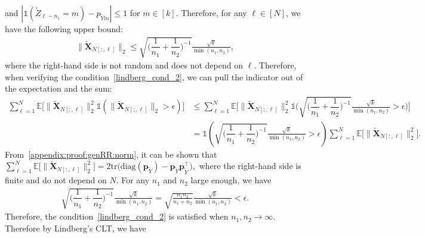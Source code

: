 \documentclass[twoside,11pt]{article}
\newcommand{\indicator}[1]{\mathds{1}\left( #1 \right) }%
\newcommand{\rvTwo}{Y}
\newcommand{\rvThree}{Z}
\newcommand{\vectorize}[1]{\mathbf{#1}}
\newcommand{\rvX}{X} %
\newcommand{\rVecX}{\vectorize{\rvX}}
\newcommand{\rvY}{Y}
\newcommand{\mE}{\mathbb{E}} %
\newcommand{\alphabetSize}{k} %
\newcommand{\vectorIndex}{m}
\newcommand{\sampleSize}{n}
\newcommand{\probVecElement}[2]{p_{{#1}{#2}}}
\newcommand{\probVec}{\mathbf{p}} %
\begin{document}
\begin{appendix}
	and
	$| \mathds{1}(\tilde{\rvThree}_{\ell-\sampleSize_1} = \vectorIndex)   - \probVecElement{ \tilde{\rvY}}{\vectorIndex}
	| \leq 1$ for $\vectorIndex \in [\alphabetSize]$.
	Therefore, for any $\ell \in [N]$, we have the following upper bound:
	\begin{align*} 
		\|\tilde{\rVecX}_{N[:,\ell]}\|_2
		\leq
		\sqrt{\biggl( \dfrac{1}{\sampleSize_1}+\dfrac{1}{\sampleSize_2} \biggr)^{-1}}
		\frac{\sqrt{\alphabetSize}}{\min(\sampleSize_1, \sampleSize_2)},
	\end{align*}
	where the right-hand side is not random and does not depend on $\ell$. Therefore, when verifying the condition~\eqref{lindberg_cond_2}, we can pull the indicator out of the expectation and the sum:
	\begin{align*}
		\sum_{\ell=1}^N
		\mE
		\bigl[
		\| \tilde{\rVecX}_{N[:,\ell]} \|_2^2
		\indicator{
			\|\tilde{\rVecX}_{N[:,\ell]}\|_2 > \epsilon
		}
		\bigr]
		&\leq
		\sum_{\ell=1}^N
		\mE
		\Biggl[
		\| \tilde{\rVecX}_{N[:,\ell]} \|_2^2
		\mathds{1}\Biggl(\sqrt{\biggl( \dfrac{1}{\sampleSize_1}+\dfrac{1}{\sampleSize_2} \biggr)^{-1}}
		\frac{\sqrt{\alphabetSize}}{\min(\sampleSize_1, \sampleSize_2)}
		> \epsilon
		\Biggr)
		\Biggr]
		\\&=
		\indicator{
			\sqrt{\biggl( \dfrac{1}{\sampleSize_1}+\dfrac{1}{\sampleSize_2} \biggr)^{-1}}
			\frac{\sqrt{\alphabetSize}}{\min(\sampleSize_1, \sampleSize_2)}
			> \epsilon
		}
		\sum_{\ell=1}^N
		\mE
		\bigl[
		\| \tilde{\rVecX}_{N[:,\ell]} \|_2^2
		\bigr].
	\end{align*}
	From~\eqref{appendix:proof:genRR:norm}, it can be shown that 	$\sum_{\ell=1}^N
	\mE
	\bigl[
	\| \tilde{\rVecX}_{N[:,\ell]} \|_2^2
	\bigr] = 2\mathrm{tr}\bigl(
	\text{diag}(\probVec_{\tilde{\rvTwo}}) - \probVec_{\tilde{\rvTwo}} \probVec_{\tilde{\rvTwo}}^\top
	\bigr),$ where the right-hand side is finite and do not depend on $N$.
	For any $\sampleSize_1$ and $\sampleSize_2$ large enough, we have
	\begin{align*}
		\sqrt{\biggl( \dfrac{1}{\sampleSize_1}+\dfrac{1}{\sampleSize_2} \biggr)^{-1}}
		\frac{\sqrt{\alphabetSize}}{\min(\sampleSize_1, \sampleSize_2)}
		=
		\sqrt{\frac{\sampleSize_1  \sampleSize_2}{\sampleSize_1 + \sampleSize_2}}
		\frac{\sqrt{\alphabetSize}}{\min(\sampleSize_1, \sampleSize_2)}
		< \epsilon.
	\end{align*}
	Therefore, the condition~\eqref{lindberg_cond_2} is satisfied when $\sampleSize_1, \sampleSize_2 \to \infty$.
	Therefore by Lindberg's CLT, we have
	\begin{align*}

\end{align*}
\end{appendix}
\end{document}
